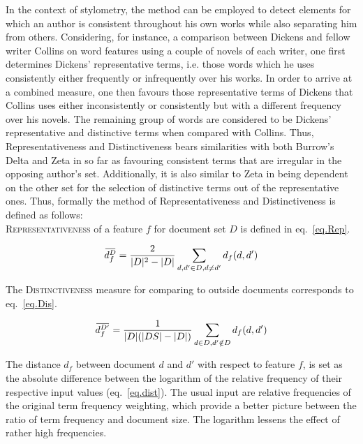 \documentclass[a4paper,10pt,twoside,fleqn]{article}
\newcommand{\overbar}[1]{\mkern 2.0mu\overline{\mkern-2.0mu#1\mkern-2.0mu}\mkern 2.0mu}
\begin{document}
In the context of stylometry, the method can be employed to detect elements for 
which an author is consistent throughout his own works while also separating him 
from others. Considering, for instance, a comparison between Dickens and fellow 
writer Collins on word features using a couple of novels of each writer, 
one first determines Dickens' representative terms, i.e. those words which he
uses consistently either frequently or infrequently over his works. 
In order to arrive at a combined measure, one then favours those representative 
terms of Dickens that Collins uses either inconsistently or consistently but with a
different frequency over his novels. The remaining group of words are considered 
to be Dickens' representative and distinctive terms when compared with Collins. 
Thus, Representativeness and Distinctiveness bears similarities with both 
Burrow's Delta \cite{Burrows2002delta} and Zeta  \cite{Burrows2007all} in so far as
favouring consistent terms that are irregular in the opposing author's set. 
Additionally, it is also similar to Zeta in being dependent on the other set 
for the selection of distinctive terms out of the representative ones. 
Thus, formally the method of Representativeness and Distinctiveness is defined 
as follows: \\

\textsc{Representativeness} of a feature $f$ for document set $D$ is defined 
in eq.~\ref{eq.Rep}.


\begin{equation}\label{eq.Rep}
 \overbar{d_f^{D}} = \frac{2}{|D|^2 -|D|} \sum\limits_{d,d' \in D,d \neq d'} d_f(d,d')
\end{equation}



The \textsc{Distinctiveness} measure for comparing to outside documents corresponds 
to eq.~\ref{eq.Dis}.


\begin{equation}\label{eq.Dis}
 \overbar{d_f^{D'}} = \frac{1}{|D|(|DS| -|D|)} \sum\limits_{d \in D, d'\notin D} d_f(d,d')
\end{equation}


The distance $d_f$ between document $d$ and $d'$ with respect to feature $f$, is set as the 
absolute difference between the logarithm of the relative frequency of their respective
input values (eq.~\ref{eq.dist}).
The usual input are relative frequencies of the original term frequency weighting, which provide a 
better picture between the ratio of term frequency and document size. 
The logarithm lessens the effect of rather high frequencies. %
\end{document}

